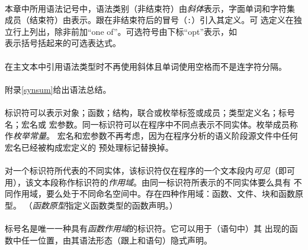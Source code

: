 
\paragraph{}
本章中所用语法记号中，语法类别（非结束符）由\textit{斜体}表示，字面单词和字符集
成员（结束符）由表示。跟在非结束符后的冒号（\texttt{:}）引入其定义。可
选定义在独立行上列出，除非前加``one of''。可选符号由下标``opt''表示，如       \\
表示括号括起来的可选表达式。

\paragraph{}
在主文本中引用语法类型时不再使用斜体且单词使用空格而不是连字符分隔。

\paragraph{}
附录\ref{synsum}给出语法总结。


\paragraph{}
标识符可以表示对象；函数；结构，联合或枚举标签或成员；类型定义名；标号名；宏名或
宏参数。同一标识符可以在程序中不同点表示不同实体。枚举成员称作\textit{枚举常量}。
宏名和宏参数不再考虑，因为在程序分析的语义阶段源文件中任何宏名已经被构成宏定义的
预处理标记替换掉。

\paragraph{}
对一个标识符所代表的不同实体，该标识符仅在程序的一个文本段内\textit{可见}（即可
用），该文本段称作标识符的\textit{作用域}。由同一标识符所表示的不同实体要么具有
不同作用域，要么处于不同命名空间中。存在四种作用域：函数、文件、块和函数原型。
（\textit{函数原型}指定义函数类型的函数声明。）

\paragraph{}
标号名是唯一一种具有\textit{函数作用域}的标识符。它可以用于（语句中）其
出现的函数中任一位置，由其语法形态（跟上\tm{:}和语句）隐式声明。

